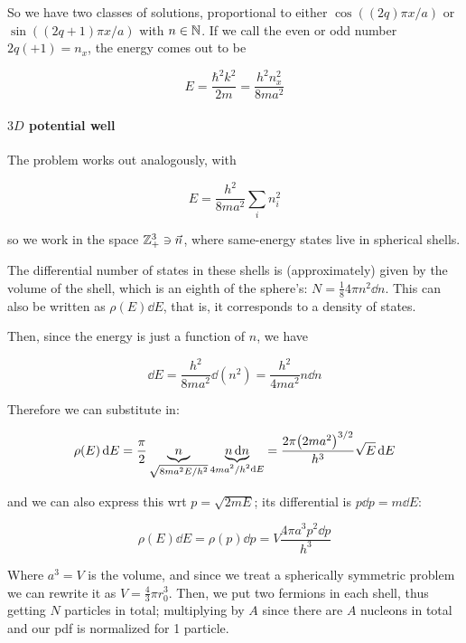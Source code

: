 \documentclass[main.tex]{subfiles}
\begin{document}
So we have two classes of solutions, proportional to either \(\cos((2q)\pi x/a)\) or \(\sin((2q+1)\pi x/a)\) with \(n
\in \mathbb{N}\). If we call the even or odd number \(2q (+1) = n_x\), the energy comes out to be

\begin{equation}
    E = \frac{\hbar^2 k^2}{2m} = \frac{h^2 n_x^2}{8ma^2}
\end{equation}

\paragraph{\(3D\) potential well}

The problem works out analogously, with

\begin{equation}
    E = \frac{h^2}{8ma^2} \sum _i  n_i^2
\end{equation}

so we work in the space \(\mathbb{Z}_+^3 \ni \vec{n} \), where same-energy states live in spherical shells.

The differential number of states in these shells is (approximately) given by the volume of the shell, which is an eighth of the sphere's: \(N = \frac{1}{8} 4 \pi n^2 \dd{n} \). This can also be written as \(\rho(E) \dd{E} \), that is, it corresponds to a density of states.

Then, since the energy is just a function of \(n\), we have

\begin{equation}
    \dd{E} = \frac{h^2}{8ma^2} \dd{(n^2)} =   \frac{h^2}{4ma^2} n\dd{n}
\end{equation}

Therefore we can substitute in:

\begin{equation}
    \rho(E) \dd{E} = \frac{\pi}{2} \underbrace{n}_{\substack{\sqrt{8ma^2 E/h^2}}} \underbrace{n \dd{n} }_{\substack{4ma^2 / h^2} \dd{E} } = \frac{2 \pi  \qty(2ma^2)^{3/2}}{h^3} \sqrt{E} \dd{E}
\end{equation}

and we can also express this wrt \(p = \sqrt{2mE} \); its differential is \(p\dd{p} = m \dd{E} \):

\begin{equation} \label{eq:fermi-model-momentum-density}
    \rho(E) \dd{E} = \rho(p) \dd{p} = V \frac{4 \pi a^3 p^2 \dd{p} }{h^3}
\end{equation}

Where \(a^3 = V\) is the volume, and since we treat a spherically symmetric problem we can rewrite it as \(V = \frac{4}{3}\pi r_0^3\). Then, we put two fermions in each shell, thus getting \(N\) particles in total; multiplying by \(A\) since there are \(A\) nucleons in total and our pdf is normalized for 1 particle.
\end{document}
